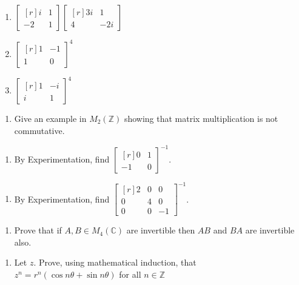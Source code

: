 \documentclass[10pt,letterpaper]{article}
\begin{document}
\begin{enumerate}[resume]
    \item $\begin{bmatrix*}[r] i & 1 \\ -2 & 1  \end{bmatrix*} \begin{bmatrix*}[r] 3i & 1 \\ 4 & -2i \end{bmatrix*}$
    \item $\begin{bmatrix*}[r] 1 & -1 \\ 1 & 0 \end{bmatrix*}^4 $
    \item $\begin{bmatrix*}[r] 1 & -i \\ i & 1 \end{bmatrix*}^4 $
  \end{enumerate}

  \begin{enumerate}[resume]
    \item Give an example in $M_2(\mathbb{Z})$ showing that matrix multiplication is not commutative.
  \end{enumerate}

  \begin{enumerate}[resume]
    \item By Experimentation, find $\begin{bmatrix*}[r] 0 & 1 \\ -1 & 0 \end{bmatrix*}^{-1}$.
  \end{enumerate}

  \begin{enumerate}[resume]
    \item By Experimentation, find $\begin{bmatrix*}[r] 2 & 0 & 0 \\ 0 & 4 & 0 \\ 0 & 0 & -1 \end{bmatrix*}^{-1}$.
  \end{enumerate}

  \begin{enumerate}[resume]
    \item Prove that if $A, B \in M_4(\mathbb{C})$ are invertible then $AB$ and $BA$ are invertible also.
  \end{enumerate}

  \begin{enumerate}[resume]
    \item Let $z$. Prove, using mathematical induction, that\mbox{}\\
          $z^n=r^n(\cos n\theta + \sin n\theta)$ for all $n \in \mathbb{Z}$
  \end{enumerate}
\end{document}
